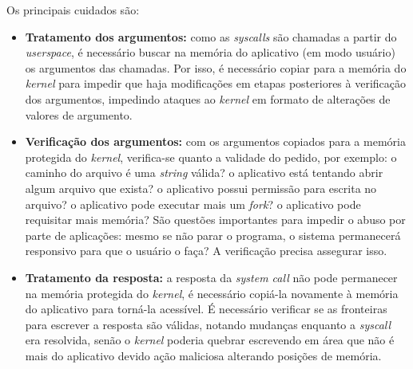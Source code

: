 \documentclass[brazilian,a4paper]{article}
\begin{document}
Os principais cuidados são:
\begin{itemize}
    \item \textbf{Tratamento dos argumentos:} como as \textit{syscalls} são chamadas a partir do \textit{userspace}, é necessário buscar na memória do aplicativo (em modo usuário) os argumentos das chamadas. Por isso, é necessário copiar para a memória do \textit{kernel} para impedir que haja modificações em etapas posteriores à verificação dos argumentos, impedindo ataques ao \textit{kernel} em formato de alterações de valores de argumento.
    \item \textbf{Verificação dos argumentos:} com os argumentos copiados para a memória protegida do \textit{kernel}, verifica-se quanto a validade do pedido, por exemplo: o caminho do arquivo é uma \textit{string} válida? o aplicativo está tentando abrir algum arquivo que exista? o aplicativo possui permissão para escrita no arquivo? o aplicativo pode executar mais um \textit{fork}? o aplicativo pode requisitar mais memória? São questões importantes para impedir o abuso por parte de aplicações: mesmo se não parar o programa, o sistema permanecerá responsivo para que o usuário o faça? A verificação precisa assegurar isso.
    \item \textbf{Tratamento da resposta:} a resposta da \textit{system call} não pode permanecer na memória protegida do \textit{kernel}, é necessário copiá-la novamente à memória do aplicativo para torná-la acessível. É necessário verificar se as fronteiras para escrever a resposta são válidas, notando mudanças enquanto a \textit{syscall} era resolvida, senão o \textit{kernel} poderia quebrar escrevendo em área que não é mais do aplicativo devido ação maliciosa alterando posições de memória.
\end{itemize}
\end{document}
